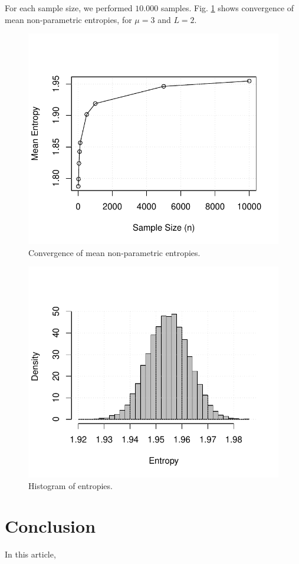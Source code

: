 \documentclass[conference]{IEEEtran}
\begin{document}
For each sample size, we performed $10.000$ samples. Fig. \ref{F4} shows convergence of mean non-parametric entropies, for $\mu=3$ and $L=2$.

%
\begin{figure}[H] 
\centering
	\includegraphics[scale=0.5]{../../../Figures/PDF/mean_entropies1}\vspace{-1.5mm} 
	\caption{Convergence of mean non-parametric entropies.}
	\label{F4}
\end{figure}
\begin{figure}[H] 
\centering
	\includegraphics[scale=0.5]{../../../Figures/PDF/histo1}\vspace{-1.5mm} 
	\caption{Histogram of entropies.}
	\label{F5}
\end{figure}
\section{Conclusion}\label{sec_09}

In this article, 


%


\end{document}
